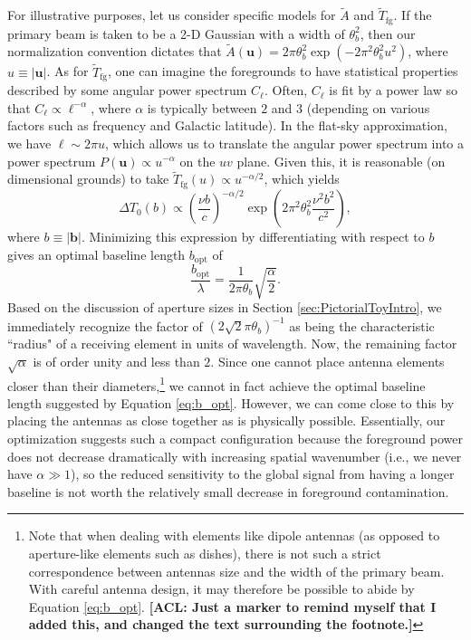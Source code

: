 \documentclass[twocolumn,apj,numberedappendix]{emulateapj}
\newcommand{\acl}[1]{{\color{red} \textbf{[ACL:  #1]}}}
\begin{document}
For illustrative purposes, let us consider specific models for $\widetilde{A}$ and $\widetilde{T}_\textrm{fg}$.  If the primary beam is taken to be a 2-D Gaussian with a width of $\theta_b^2$, then our normalization convention dictates that $\widetilde{A}(\mathbf{u}) = 2 \pi \theta_b^2 \exp (-2 \pi^2 \theta_b^2 u^2 )$, where $u \equiv |\mathbf{u}|$.  As for $\widetilde{T}_\textrm{fg}$, one can imagine the foregrounds to have statistical properties described by some angular power spectrum $C_\ell$.  Often, $C_\ell$ is fit by a power law so that $C_\ell \propto \ell^{-\alpha}$, where $\alpha$ is typically between $2$ and $3$ (depending on various factors such as frequency and Galactic latitude).  In the flat-sky approximation, we have $\ell \sim 2 \pi u$, which allows us to translate the angular power spectrum into a power spectrum $P(\mathbf{u}) \propto u^{-\alpha}$ on the $uv$ plane.  Given this, it is reasonable (on dimensional grounds) to take $\widetilde{T}_\textrm{fg} (u)\propto u^{-\alpha/2}$, which yields
\begin{equation}
\label{eq:DeviationPowGauss}
\Delta T_0(b) \propto \left( \frac{\nu b}{c}\right)^{-\alpha/2} \exp \left(2 \pi^2 \theta_b^2 \frac{\nu^2 b^2}{c^2}  \right),
\end{equation}
where $b \equiv | \mathbf{b} |$.  Minimizing this expression by differentiating with respect to $b$ gives an optimal baseline length $b_\textrm{opt}$ of
\begin{equation}
\label{eq:b_opt}
\frac{b_\textrm{opt}}{\lambda} = \frac{1}{2\pi \theta_b} \sqrt{\frac{\alpha}{2}}.
\end{equation}
Based on the discussion of aperture sizes in Section \ref{sec:PictorialToyIntro}, we immediately
recognize the factor of $(2 \sqrt{2} \pi \theta_b)^{-1}$ as being the characteristic ``radius" of a receiving element in units of wavelength. Now, the remaining factor $\sqrt{\alpha}$ is of order unity and less than
$2$. Since one cannot place antenna elements closer than their diameters,\footnote{Note that
when dealing with elements like dipole antennas (as opposed to aperture-like elements such as dishes), there is not such a strict correspondence between antennas size and the width of the primary beam. With careful antenna design, it may therefore be possible to abide by Equation \eqref{eq:b_opt}. \acl{Just a marker to remind myself that I added this, and changed the text surrounding the footnote.}} we cannot in fact
achieve the optimal baseline length suggested by Equation \eqref{eq:b_opt}. However, we can
come close to this by placing the antennas as close together as is physically possible. Essentially, our
optimization suggests such a compact configuration because the foreground power does not decrease
dramatically with increasing spatial wavenumber (i.e., we never have $\alpha \gg 1$), so the reduced sensitivity to the global signal from having a longer baseline is not worth the relatively small decrease in foreground contamination.
\end{document}
